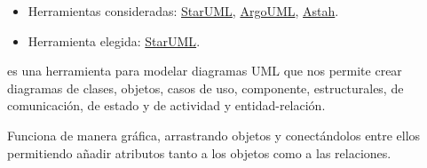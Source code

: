 \begin{itemize}
	\tightlist
	\item
	Herramientas consideradas:
	\href{http://staruml.io/}{StarUML}, 
	\href{http://argouml.tigris.org/}{ArgoUML},
	\href{http://astah.net/}{Astah}.
	\item
	Herramienta elegida:
	\href{http://staruml.io/}{StarUML}.
\end{itemize}

 es una herramienta para modelar diagramas UML que nos permite crear diagramas de clases, objetos, casos de uso, componente, estructurales, de comunicación, de estado y de actividad y entidad-relación.

Funciona de manera gráfica, arrastrando objetos y conectándolos entre ellos permitiendo añadir atributos tanto a los objetos como a las relaciones.
